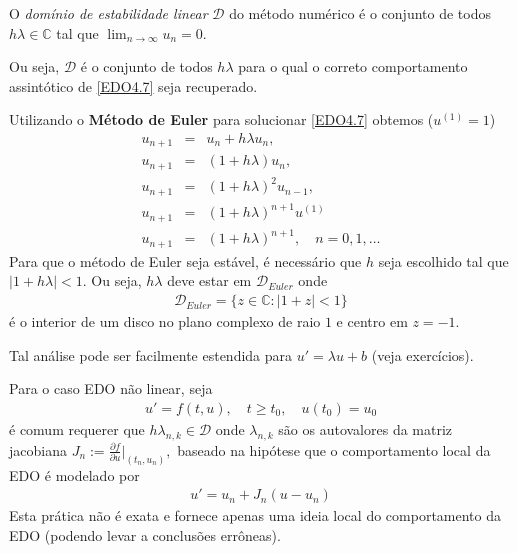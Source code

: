 


\begin{defn}
O \emph{domínio de estabilidade linear} $\mathcal D$ do método numérico é o conjunto de todos $h\lambda  \in  \mathbb{C}$ tal que $\lim_{n\rightarrow \infty }u_n=0$.
\end{defn}

Ou seja, $\mathcal D$ é o conjunto de todos $h\lambda $ para o qual o correto comportamento assintótico de \eqref{EDO4.7} seja recuperado.



\begin{ex}
Utilizando o \textbf{Método de Euler} para solucionar \eqref{EDO4.7} obtemos ($u^{(1)}=1$)
\begin{eqnarray}
 u_{n+1}   & =& u_n+h\lambda u_n, \\
 u_{n+1}   & =& (1+h\lambda )u_n, \\
 u_{n+1}   & =& (1+h\lambda )^2u_{n-1}, \\
 u_{n+1}   & =& (1+h\lambda )^{n+1}u^{(1)} \\
 u_{n+1}   & =& (1+h\lambda )^{n+1}  , \quad  n=0,1,\ldots
\end{eqnarray}
Para que o método de Euler seja estável, é necessário que $h$ seja escolhido tal que $|1+h\lambda |<1$. Ou seja, $h\lambda $ deve estar em $\mathcal D_{Euler}$ onde
\begin{eqnarray}
 \mathcal D_{Euler} = \{z \in  \mathbb{C}: |1+z|<1\}
\end{eqnarray}
é o interior de um disco no plano complexo de raio $1$ e centro em $z=-1$.%
\end{ex}


Tal análise pode ser facilmente estendida para $u'=\lambda u+b$ (veja exercícios).

Para o caso EDO não linear, seja
\begin{eqnarray}
u'= f(t,u), \quad  t\geq t_0, \quad  u(t_0)=u_0
\end{eqnarray}
é comum requerer que $h\lambda _{n,k} \in \mathcal D$ onde $\lambda _{n,k}$ são os autovalores da matriz jacobiana $J_n := \frac{\partial f}{\partial u}|_{(t_n,u_n)},$ baseado na hipótese que o comportamento local da EDO é modelado por
\begin{eqnarray}
  u'= u_n + J_n(u-u_n)
\end{eqnarray}
Esta prática não é exata e fornece apenas uma ideia local do comportamento da EDO (podendo levar a conclusões errôneas).


